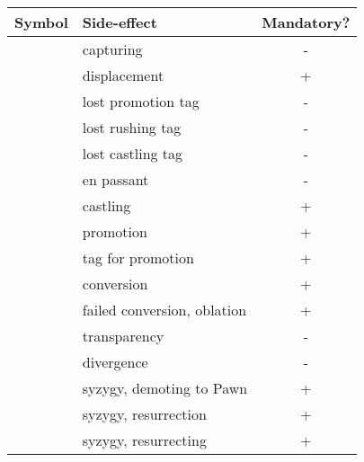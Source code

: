 \begin{table}[!h]
\centering
\begin{tabular}{ rlc }
\toprule %
\textbf{Symbol}             & \textbf{Side-effect}          & \textbf{Mandatory?}   \\
\midrule %
\alg{*}                     & capturing                     & -                     \\
\alg{<}                     & displacement                  & +\footnotemark[1]     \\
\cmidrule{1-3} %
\alg{==}                    & lost promotion tag            & -                     \\
\alg{::}                    & lost rushing tag              & -                     \\
\alg{\&\&}                  & lost castling tag             & -                     \\
\cmidrule{1-3} %
\alg{:}                     & en passant                    & -                     \\
\alg{\&}                    & castling                      & +\footnotemark[2]     \\
\alg{=}                     & promotion                     & +\footnotemark[3]     \\
\alg{=}                     & tag for promotion             & +                     \\
\alg{\%}                    & conversion                    & +                     \\
\alg{\%\%}                  & failed conversion, oblation   & +                     \\
\alg{\^{}}                  & transparency                  & -                     \\
\alg{/}                     & divergence                    & -                     \\
\alg{>}                     & syzygy, demoting to Pawn      & +                     \\
\alg{\$}                    & syzygy, resurrection          & +                     \\
\cmidrule{1-3} %
\multirow{2}{*}{\alg{\$\$}} & syzygy, resurrecting          & \multirow{2}{*}{+}    \\

\end{tabular}
\end{table}
